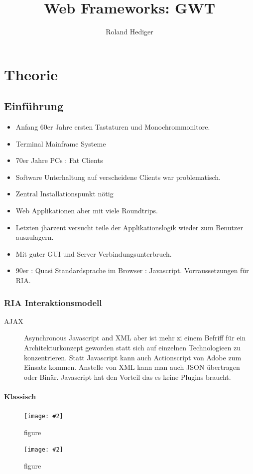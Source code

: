 \documentclass[a4paper,10pt]{scrreprt}
\title{Web Frameworks: GWT}
\author{Roland Hediger}
\newcommand{\pic}[2][figure]{\begin{figure}[h]
 \centering
 \texttt{[image: \#2]}
 \caption{#1}
\end{figure}
}
\begin{document}
\maketitle 
\tableofcontents
\pagestyle{fancy}
\part{Theorie}
\chapter{Einführung}
\begin{itemize}
 \item Anfang 60er Jahre ersten Tastaturen und Monochrommonitore.
 \item Terminal Mainframe Systeme
 \item 70er Jahre PCs : Fat Clients
 \item Software Unterhaltung auf verscheidene Clients war problematisch.
 \item Zentral Installationspunkt nötig
 \item Web Applikationen aber mit viele Roundtrips.
 \item Letzten jharzent versucht teile der Applikationslogik wieder zum Benutzer auszulagern.
 \item Mit guter GUI und Server Verbindungsunterbruch.
 \item  90er : Quasi Standardsprache im Browser : Javascript. Vorraussetzungen für RIA.
 

\end{itemize}

\section{RIA Interaktionsmodell}
\begin{description}
 \item [AJAX] Asynchronous Javascript and XML aber ist mehr zi einem Befriff für ein Architekturkonzept geworden statt 
sich auf einzelnen Technologieen zu konzentrieren. Statt Javascript kann auch Actionscript von Adobe zum Einsatz 
kommen. Anstelle von XML kann man auch JSON übertragen oder Binär. Javascript hat den Vorteil das es keine Plugins 
braucht.
\end{description}

\subsection{Klassisch}
\pic{ria1.png}
\pic{ria2.png}
\end{document}
